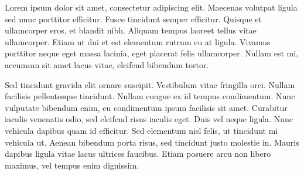 \startintroduction
Lorem ipsum dolor sit amet, consectetur adipiscing elit. Maecenas volutpat ligula sed nunc porttitor efficitur. Fusce tincidunt semper efficitur. Quisque et ullamcorper eros, et blandit nibh. Aliquam tempus laoreet tellus vitae ullamcorper. Etiam ut dui et est elementum rutrum eu at ligula. Vivamus porttitor neque eget massa lacinia, eget placerat felis ullamcorper. Nullam est mi, accumsan sit amet lacus vitae, eleifend bibendum tortor.\par
Sed tincidunt gravida elit ornare suscipit. Vestibulum vitae fringilla orci. Nullam facilisis pellentesque tincidunt. Nullam congue ex id tempus condimentum. Nunc vulputate bibendum enim, eu condimentum ipsum facilisis sit amet. Curabitur iaculis venenatis odio, sed eleifend risus iaculis eget. Duis vel neque ligula. Nunc vehicula dapibus quam id efficitur. Sed elementum nisl felis, ut tincidunt mi vehicula ut. Aenean bibendum porta risus, sed tincidunt justo molestie in. Mauris dapibus ligula vitae lacus ultrices faucibus. Etiam posuere arcu non libero maximus, vel tempus enim dignissim.\par 